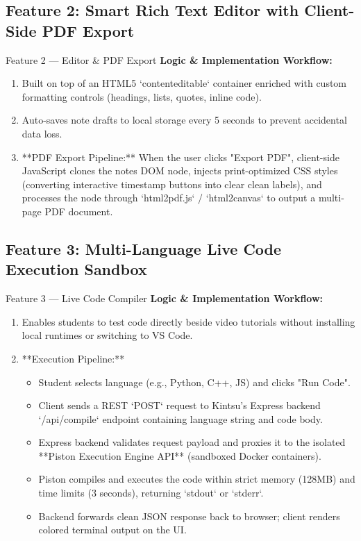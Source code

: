 \documentclass[12pt,a4paper]{article}
\begin{document}
\subsection{Feature 2: Smart Rich Text Editor with Client-Side PDF Export}
\begin{featurebox}{Feature 2 --- Editor \& PDF Export}
\textbf{Logic \& Implementation Workflow:} 
\begin{enumerate}[leftmargin=1.2cm]
    \item Built on top of an HTML5 `contenteditable` container enriched with custom formatting controls (headings, lists, quotes, inline code).
    \item Auto-saves note drafts to local storage every 5 seconds to prevent accidental data loss.
    \item **PDF Export Pipeline:** When the user clicks "Export PDF", client-side JavaScript clones the notes DOM node, injects print-optimized CSS styles (converting interactive timestamp buttons into clear clean labels), and processes the node through `html2pdf.js` / `html2canvas` to output a multi-page PDF document.
\end{enumerate}
\end{featurebox}

\subsection{Feature 3: Multi-Language Live Code Execution Sandbox}
\begin{featurebox}{Feature 3 --- Live Code Compiler}
\textbf{Logic \& Implementation Workflow:} 
\begin{enumerate}[leftmargin=1.2cm]
    \item Enables students to test code directly beside video tutorials without installing local runtimes or switching to VS Code.
    \item **Execution Pipeline:** 
    \begin{itemize}
        \item Student selects language (e.g., Python, C++, JS) and clicks "Run Code".
        \item Client sends a REST `POST` request to Kintsu’s Express backend `/api/compile` endpoint containing language string and code body.
        \item Express backend validates request payload and proxies it to the isolated **Piston Execution Engine API** (sandboxed Docker containers).
        \item Piston compiles and executes the code within strict memory (128MB) and time limits (3 seconds), returning `stdout` or `stderr`.
        \item Backend forwards clean JSON response back to browser; client renders colored terminal output on the UI.
    \end{itemize}
\end{enumerate}
\end{featurebox}
\end{document}
